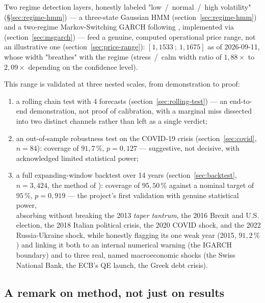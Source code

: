 \documentclass[12pt,a4paper]{article}
\begin{document}
	\begin{econbox} 
		
		Two regime detection layers, honestly labeled "low~/~normal~/~high
		volatility"
		(\S\ref{sec:regime-hmm}) --- a three-state Gaussian HMM
		(section~\ref{sec:regime-hmm}) and a two-regime Markov-Switching
		GARCH following \citet{haasmittnikpaolella2004}, implemented via
		\citet{ardia2019} (section~\ref{sec:msgarch}) --- feed a
		genuine, computed operational price range, not an
		illustrative one (section~\ref{sec:price-range}): $[1{,}1533~;~1{,}1675]$
		as of 2026-09-11, whose width "breathes" with the regime
		(stress~/~calm width ratio of $1{,}88\times$ to $2{,}09\times$
		depending on the confidence level).
	\end{econbox}	
	
	\newpage
	
	This range is validated at three nested scales, from
	demonstration to proof:
	\begin{enumerate}
		\item a rolling chain test with 4 forecasts
		(section~\ref{sec:rolling-test}) --- an end-to-end
		demonstration, not proof of calibration, with a marginal
		miss dissected into two distinct channels rather than left as a
		single verdict;
		\item an out-of-sample robustness test on the COVID-19 crisis
		(section~\ref{sec:covid}, $n=84$): coverage of $91{,}7\,\%$,
		$p=0{,}127$ --- suggestive, not decisive, with
		acknowledged limited statistical power;
		\item a full expanding-window backtest over 14 years
		(section~\ref{sec:backtest}, $n=3,424$, the method of
		\citet{west1996}): coverage of $95{,}50\,\%$ against a
		nominal target of $95\,\%$, $p=0{,}919$ --- the project's first
		validation with genuine statistical power, \\absorbing without
		breaking the 2013 \emph{taper tantrum}, the 2016 Brexit and
		U.S. election, the 2018 Italian political crisis, the 2020
		COVID shock, and the 2022 Russia-Ukraine shock, while
		honestly flagging its one weak year (2015, $91{,}2\,\%$) and
		linking it both to an internal numerical
		warning (the IGARCH boundary) and to three real, named
		macroeconomic shocks (the Swiss National Bank, the ECB's
		QE launch, the Greek debt crisis).
	\end{enumerate}
	
	\newpage
	
	\subsection{A remark on method, not just on results}
	
\end{document}
